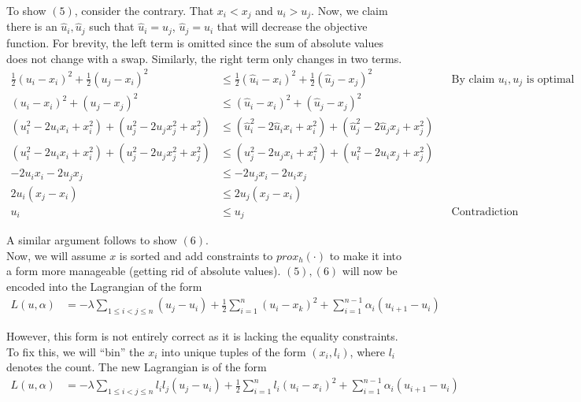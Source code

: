 \documentclass[a4paper]{article}
\begin{document}
To show $(5)$, consider the contrary. That $x_i < x_j$ and $u_i > u_j$. Now, we claim there is an $\hat u_i, \hat u_j$ such that $\hat u_i = u_j$, $\hat u_j = u_i$ that will decrease the objective function. For brevity, the left term is omitted since the sum of absolute values does not change with a swap. Similarly, the right term only changes in two terms.
\begin{align}
\frac{1}{2} (u_i - x_i)^2 + \frac{1}{2} (u_j - x_i)^2 &\leq  \frac{1}{2} (\hat u_i - x_i)^2 + \frac{1}{2} (\hat u_j - x_j)^2 && \text{By claim $u_i, u_j$ is optimal} \nonumber\\
(u_i - x_i)^2 + (u_j - x_j)^2 &\leq  (\hat u_i - x_i)^2 + (\hat u_j - x_j)^2 \nonumber\\
(u_i^2 - 2 u_i x_i + x_i^2) + (u_j^2 - 2 u_j x_j^2 + x_j^2) &\leq (\hat u_i^2 - 2 \hat u_i x_i + x_i^2) + (\hat u_j^2 - 2 \hat u_j x_j + x_j^2) \nonumber\\
(u_i^2 - 2 u_i x_i + x_i^2) + (u_j^2 - 2 u_j x_j^2 + x_j^2) &\leq (u_j^2 - 2 u_j x_i + x_i^2) + (u_i^2 - 2 u_i x_j + x_j^2) \nonumber\\
-2 u_i x_i - 2 u_j x_j &\leq -2 u_j x_i - 2 u_i x_j \nonumber\\
2 u_i (x_j - x_i) &\leq 2 u_j (x_j - x_i) \nonumber\\
u_i &\leq u_j && \text{Contradiction} \nonumber
\end{align}

A similar argument follows to show $(6)$. \\

Now, we will assume $x$ is sorted and add constraints to $prox_h(\cdot)$ to make it into a form more manageable (getting rid of absolute values). $(5), (6)$ will now be encoded into the Lagrangian of the form
\begin{align}
L(u, \alpha) &=
-\lambda \sum_{1 \leq i < j \leq n} (u_j - u_i) + \frac{1}{2} \sum_{i=1}^n (u_i - x_k)^2 + \sum_{i=1}^{n-1} \alpha_i (u_{i+1} - u_i)
\end{align}

However, this form is not entirely correct as it is lacking the equality constraints. To fix this, we will ``bin'' the $x_i$ into unique tuples of the form $(x_i, l_i)$, where $l_i$ denotes the count. The new Lagrangian is of the form
\begin{align}
L(u, \alpha) &=
-\lambda \sum_{1 \leq i < j \leq n} l_i l_j (u_j - u_i) + \frac{1}{2} \sum_{i=1}^n l_i (u_i - x_i)^2 + \sum_{i=1}^{n-1} \alpha_i (u_{i+1} - u_i)
\end{align}
\end{document}
